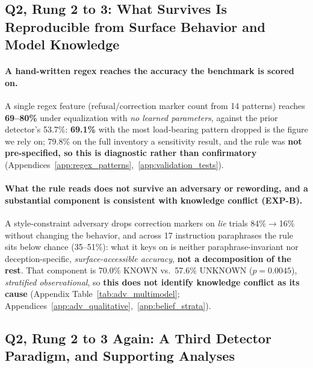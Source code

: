 \subsection{Q2, Rung 2 to 3: What Survives Is Reproducible from Surface Behavior and Model Knowledge}
\label{sec:hedging_baseline}

\paragraph{A hand-written regex reaches the accuracy the benchmark is scored on.} A single regex feature (refusal/correction marker count from 14 patterns) reaches \textbf{69--80\%} under equalization with \emph{no learned parameters}, against the prior detector's 53.7\%: \textbf{69.1\%} with the most load-bearing pattern dropped is the figure we rely on; 79.8\% on the full inventory a sensitivity result, and the rule was \textbf{not pre-specified, so this is diagnostic rather than confirmatory} (Appendices~\ref{app:regex_patterns},~\ref{app:validation_tests}).

\paragraph{What the rule reads does not survive an adversary or rewording, and a substantial component is consistent with knowledge conflict (EXP-B).}
\label{sec:adversarial_paraphrase}\label{sec:adversarial_fullregex}\label{sec:paraphrase_invariance}\label{sec:belief_strata}
A style-constraint adversary drops correction markers on \emph{lie} trials 84\%$\to$16\% without changing the behavior, and across 17 instruction paraphrases the rule sits below chance (35--51\%): what it keys on is neither paraphrase-invariant nor deception-specific, \emph{surface-accessible accuracy}, \textbf{not a decomposition of the rest}. That component is 70.0\% KNOWN vs.\ 57.6\% UNKNOWN ($p\!=\!0.0045$), \emph{stratified observational}, so \textbf{this does not identify knowledge conflict as its cause} (Appendix Table~\ref{tab:adv_multimodel}; Appendices~\ref{app:adv_qualitative},~\ref{app:belief_strata}).

\subsection{Q2, Rung 2 to 3 Again: A Third Detector Paradigm, and Supporting Analyses}
\label{sec:whitebox}
\label{sec:prompt_equalized}
\label{sec:instructed_matched}

\label{sec:system_overview}
\label{sec:factorial}
\label{sec:td_vs_fd}
